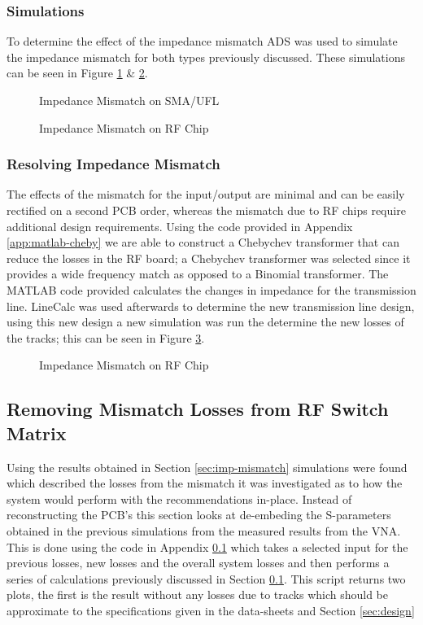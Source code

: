 \documentclass[12pt,openany,a4paper]{book}
\begin{document}
\subsubsection{Simulations}
To determine the effect of the impedance mismatch ADS was used to simulate the impedance mismatch for both types previously discussed. These simulations can be seen in Figure \ref{fig:imp-mismatch-1} \& \ref{fig:imp-mismatch-2}.
\begin{figure}[H]
	\centering
	\caption{Impedance Mismatch on SMA/UFL}
	\label{fig:imp-mismatch-1}
\end{figure} 
\begin{figure}[H]
	\centering
	\caption{Impedance Mismatch on RF Chip}
	\label{fig:imp-mismatch-2}
\end{figure} 


\subsubsection{Resolving Impedance Mismatch}
The effects of the mismatch for the input/output are minimal and can be easily rectified on a second PCB order, whereas the mismatch due to RF chips require additional design requirements. Using the code provided in Appendix \ref{app:matlab-cheby} we are able to construct a Chebychev transformer that can reduce the losses in the RF board; a Chebychev transformer was selected since it provides a wide frequency match as opposed to a Binomial transformer. The MATLAB code provided calculates the changes in impedance for the transmission line. LineCalc was used afterwards to determine the new transmission line design, using this new design a new simulation was run the determine the new losses of the tracks; this can be seen in Figure \ref{fig:imp-mismatch-3}.
\begin{figure}[H]
	\centering
	\caption{Impedance Mismatch on RF Chip}
	\label{fig:imp-mismatch-3}
\end{figure} 



\subsection{Removing Mismatch Losses from RF Switch Matrix}
Using the results obtained in Section \ref{sec:imp-mismatch} simulations were found which described the losses from the mismatch it was investigated as to how the system would perform with the recommendations in-place. Instead of reconstructing the PCB's this section looks at de-embeding the S-parameters obtained in the previous simulations from the measured results from the VNA. This is done using the code in Appendix \ref{} which takes a selected input for the previous losses, new losses and the overall system losses and then performs a series of calculations previously discussed in Section \ref{}. %
This script returns two plots, the first is the result without any losses due to tracks which should be approximate to the specifications given in the data-sheets and Section \ref{sec:design}
\end{document}
